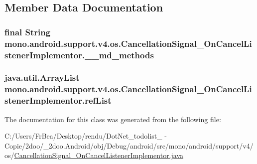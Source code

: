 \subsection{Member Data Documentation}
\hypertarget{classmono_1_1android_1_1support_1_1v4_1_1os_1_1_cancellation_signal___on_cancel_listener_implementor_5eec9005f7084d8e489ea6fbe475df40}{
\subsubsection[{\_\-\_\-md\_\-methods}]{\setlength{\rightskip}{0pt plus 5cm}final String {\bf mono.android.support.v4.os.CancellationSignal\_\-OnCancelListenerImplementor.\_\-\_\-md\_\-methods}}}
\label{classmono_1_1android_1_1support_1_1v4_1_1os_1_1_cancellation_signal___on_cancel_listener_implementor_5eec9005f7084d8e489ea6fbe475df40}


\hypertarget{classmono_1_1android_1_1support_1_1v4_1_1os_1_1_cancellation_signal___on_cancel_listener_implementor_76c69289cc3882ce8bdf0c600da13b8a}{
\subsubsection[{refList}]{\setlength{\rightskip}{0pt plus 5cm}java.util.ArrayList {\bf mono.android.support.v4.os.CancellationSignal\_\-OnCancelListenerImplementor.refList}}}
\label{classmono_1_1android_1_1support_1_1v4_1_1os_1_1_cancellation_signal___on_cancel_listener_implementor_76c69289cc3882ce8bdf0c600da13b8a}




The documentation for this class was generated from the following file:\begin{CompactItemize}
\item 
C:/Users/FrBea/Desktop/rendu/DotNet\_\-todolist\_ - Copie/2doo/\_\-2doo.Android/obj/Debug/android/src/mono/android/support/v4/os/\hyperlink{_cancellation_signal___on_cancel_listener_implementor_8java}{CancellationSignal\_\-OnCancelListenerImplementor.java}\end{CompactItemize}
